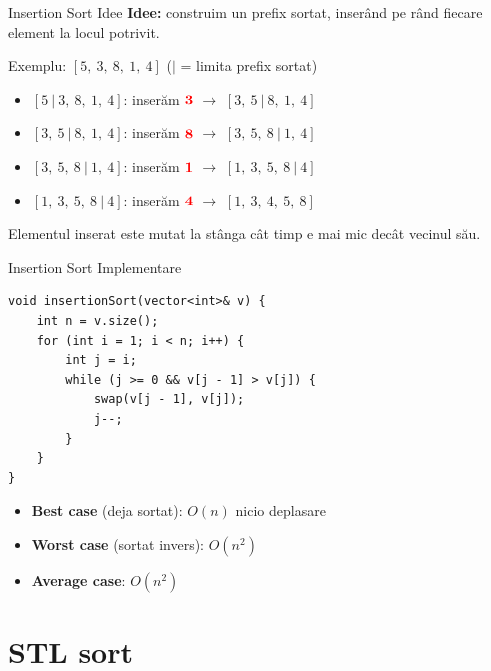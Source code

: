 \documentclass{beamer}
\begin{document}
\begin{frame}{Insertion Sort \textemdash{} Idee}
  \textbf{Idee:} construim un prefix sortat, inserând pe rând fiecare element la locul potrivit.
  \bigskip

  Exemplu: $[5,\ 3,\ 8,\ 1,\ 4]$ \quad ($|$ = limita prefix sortat)
  \begin{itemize}
    \item $[5\ |\ 3,\ 8,\ 1,\ 4]$: inserăm $\textcolor{red}{\mathbf{3}}$ $\rightarrow$ $[3,\ 5\ |\ 8,\ 1,\ 4]$
    \item $[3,\ 5\ |\ 8,\ 1,\ 4]$: inserăm $\textcolor{red}{\mathbf{8}}$ $\rightarrow$ $[3,\ 5,\ 8\ |\ 1,\ 4]$
    \item $[3,\ 5,\ 8\ |\ 1,\ 4]$: inserăm $\textcolor{red}{\mathbf{1}}$ $\rightarrow$ $[1,\ 3,\ 5,\ 8\ |\ 4]$
    \item $[1,\ 3,\ 5,\ 8\ |\ 4]$: inserăm $\textcolor{red}{\mathbf{4}}$ $\rightarrow$ $[1,\ 3,\ 4,\ 5,\ 8]$ \checkmark
  \end{itemize}
  \medskip
  Elementul inserat este mutat la stânga cât timp e mai mic decât vecinul său.
\end{frame}

\begin{frame}[fragile]{Insertion Sort \textemdash{} Implementare}
  \begin{lstlisting}
void insertionSort(vector<int>& v) {
    int n = v.size();
    for (int i = 1; i < n; i++) {
        int j = i;
        while (j >= 0 && v[j - 1] > v[j]) {
            swap(v[j - 1], v[j]);
            j--;
        }
    }
}
  \end{lstlisting}
  \begin{itemize}
    \item \textbf{Best case} (deja sortat): $O(n)$ \textemdash{} nicio deplasare
    \item \textbf{Worst case} (sortat invers): $O(n^2)$
    \item \textbf{Average case}: $O(n^2)$
  \end{itemize}
\end{frame}

\section{STL sort}
\end{document}
